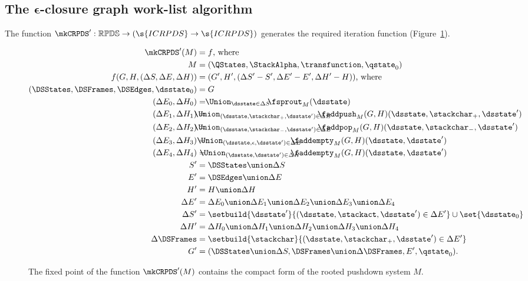 \subsection{The $\boldsymbol\epsilon$-closure 
  graph work-list algorithm}
The function $\mkCRPDS' : \mathbb{RPDS} \to (\s{ICRPDS} \to
\s{ICRPDS})$ generates the required iteration function (Figure~\ref{fig:mkcompact-ecg}).
\begin{figure}
\figrule
\begin{align*}
  \mkCRPDS'(M)
  &= 
  f\text{, where }
  \\
  M &= (\QStates,\StackAlpha,\transfunction,\qstate_0)
  \\
  f(G,H,(\Delta S, \Delta E,\Delta H)) &=
   (G',H',(\Delta S' - S',\Delta E' - E',\Delta H' -  H))\text{, where }
  \\
  (\DSStates,\DSFrames,\DSEdges,\dsstate_0)  &= G 
  \\
  (\Delta E_0, \Delta H_0) &= \!\! \Union_{\dsstate \in \Delta S} \!\!  \fsprout_M(\dsstate)
  \\
  (\Delta E_1, \Delta H_1) &= 
  \!\!\!\!\!\!\!\!\!\!
  \Union_{(\dsstate,\stackchar_+,\dsstate') \in \Delta E} 
  \!\!\!\!\!\!\!\!\!\!
  \faddpush_M(G,H) (\dsstate,\stackchar_+,\dsstate') 
  \\
  (\Delta E_2, \Delta H_2) &=
  \!\!\!\!\!\!\!\!\!\!
  \Union_{(\dsstate,\stackchar_-,\dsstate') \in \Delta E} 
  \!\!\!\!\!\!\!\!\!\!
  \faddpop_M(G,H) (\dsstate,\stackchar_-,\dsstate')  
  \\
  (\Delta E_3, \Delta H_3) &=
  \!\!\!\!\!\!\!\!
  \Union_{(\dsstate,\epsilon,\dsstate') \in \Delta E} 
  \!\!\!\!\!\!\!\!
  \faddempty_M(G,H) (\dsstate,\dsstate')   
  \\
  (\Delta E_4, \Delta H_4) &=
  \!\!\!\!\!\!
  \Union_{(\dsstate,\dsstate') \in \Delta H} 
  \!\!\!\!\!\!\!
  \faddempty_M(G,H) (\dsstate,\dsstate')   
  \\
  S' &= \DSStates \union \Delta S
  \\
  E' &= \DSEdges \union \Delta E
  \\
  H' &= H \union \Delta H
  \\
  \Delta E' &= \Delta E_0 \union \Delta E_1 \union \Delta E_2 \union \Delta E_3 \union \Delta E_4
  \\
  \Delta S' &= \setbuild{ \dsstate' }{ (\dsstate,\stackact,\dsstate') \in \Delta E' } \cup \set{\dsstate_0}
  \\
  \Delta H' &= \Delta H_0 \union \Delta H_1 \union \Delta H_2 \union \Delta H_3 \union \Delta H_4
  \\
  \Delta \DSFrames &= \setbuild{\stackchar}{(\dsstate,\stackchar_+,\dsstate') \in \Delta E'}
  \\
  G' &= (\DSStates \union \Delta S,\DSFrames \union \Delta \DSFrames, E',\qstate_0)
  \text.
\end{align*}
\caption{The fixed point of the function $\mkCRPDS'(M)$ contains
  the compact form of the rooted pushdown system $M$.}
\label{fig:mkcompact-ecg}
\figrule
\end{figure}
